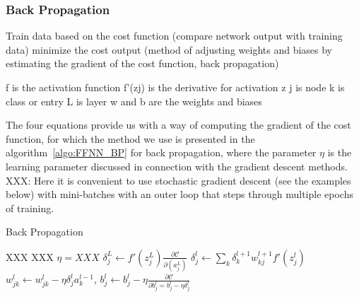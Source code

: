 \documentclass[english,notitlepage,reprint,nofootinbib]{revtex4–2}  %
\begin{document}
\subsubsection{Back Propagation} %
Train data based on the cost function (compare network output with training data) 
minimize the cost output (method of adjusting weights and biases by estimating the gradient of the cost function, back propagation) 

f is the activation function 
f'(zj) is the derivative for activation z 
j is node 
k is class or entry 
L is layer 
w and b are the weights and biases 


The four equations provide us with a way of computing the gradient of the cost function, for which the method we use is presented in the algorithm~\ref{algo:FFNN_BP} for back propagation, where the parameter $\eta$ is the learning parameter discussed in connection with the gradient descent methods. 
XXX: Here it is convenient to use stochastic gradient descent (see the examples below) with mini-batches with an outer loop that steps through multiple epochs of training. 

\begin{algorithm}[H]
    \caption{Back Propagation}\label{algo:FFNN_BP}
    \begin{algorithmic}
        \State XXX 
        \State XXX
        \State $\eta = XXX$ 
        \State $\delta_j^L \leftarrow f'(z_j^L) \frac{\partial\mathcal{C}}{\partial(a_j^L)}$
        \State $\delta_j^l \leftarrow \sum_k \delta_k^{l+1} w_{kj}^{l+1} f'(z_j^l)$
        \State $w^l_{jk} \leftarrow w^l_{jk} - \eta\delta^l_j a^{l-1}_k$, 
        \State $b^l_{j} \leftarrow b^l_{j} - \eta\frac{\partial\mathcal{C}}{\partial b^l_j = b^l_j - \eta\delta^l_j}$
        
    \end{algorithmic}
\end{algorithm}
\vspace{3mm}
\\
\end{document}
